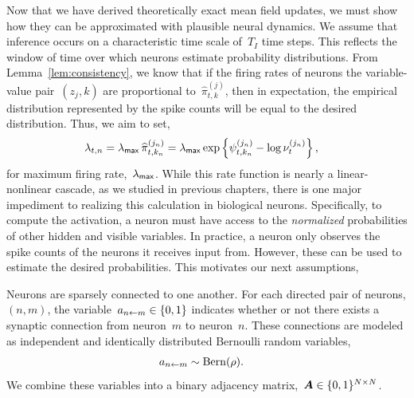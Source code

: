 Now that we have derived theoretically exact mean field updates, we
must show how they can be approximated with plausible neural dynamics.
We assume that inference occurs on a characteristic time scale of~$T_I$
time steps. This reflects the window of time over which neurons estimate
probability distributions.
From Lemma~\ref{lem:consistency}, we know that if the firing rates of
neurons the variable-value pair~${(z_j,k)}$ are proportional
to~$\widehat{\pi}_{t,k}^{(j)}$, then in expectation, the empirical
distribution represented by the spike counts will be equal to the
desired distribution. Thus, we aim to set,
\begin{align*}
  \lambda_{t,n} &= \lambda_{\mathsf{max}} \, \widehat{\pi}_{t,k_n}^{(j_n)}
  = \lambda_{\mathsf{max}} \exp \left \{\psi_{t,k_n}^{(j_n)} -\log \nu_{t}^{(j_n)} \right \},
\end{align*}
for maximum firing rate,~$\lambda_{\mathsf{max}}$. While this rate function is
nearly a linear-nonlinear cascade, as we studied in previous
chapters, there is one major impediment to realizing this
calculation in biological neurons. Specifically, to compute
the activation, a neuron must have access to the \emph{normalized}
probabilities of other hidden and visible variables. In practice,
a neuron only observes the spike counts of the neurons it receives 
input from. However, these can be used to estimate the desired probabilities.
This motivates our next assumptions,

\begin{assumption}
  Neurons are sparsely connected to one another. For each directed
  pair of neurons, $(n,m)$, the variable~$a_{n \leftarrow m} \in \{0,1\}$
  indicates whether or not there exists a synaptic connection from
  neuron~$m$ to neuron~$n$. These connections are modeled as
  independent and identically distributed Bernoulli random variables,
  \begin{align*}
    a_{n \leftarrow m} &\sim \mathrm{Bern}(\rho).
  \end{align*}
  We combine these variables into a binary adjacency 
  matrix,~$\boldsymbol{A} \in \{0,1\}^{N \times N}$.
\end{assumption}


